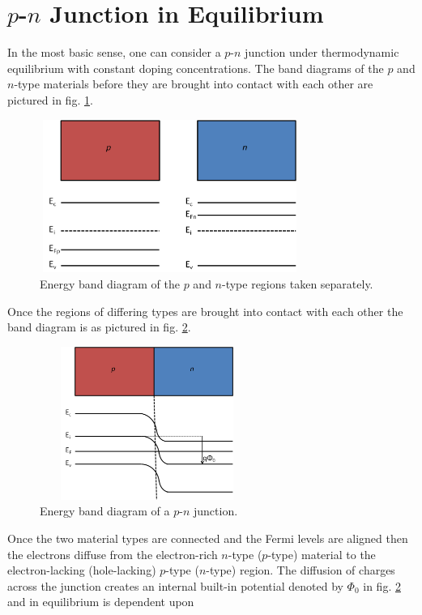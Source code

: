 \documentclass[%
 reprint,
 amsmath,amssymb,
 aps,
pra,
floatfix,
]{revtex4-1}
\begin{document}
\section{$p$-$n$ Junction in Equilibrium}\label{sec:sec002}
In the most basic sense, one can consider a $p$-$n$ junction under thermodynamic equilibrium with 
constant doping concentrations. The band diagrams of the $p$ and $n$-type materials before they are brought
into contact with each other are pictured in  fig. \ref{fig:fig1}. 
%
\begin{figure}[h!]
    \centering
    \includegraphics[height=5cm,width=8.5cm]{figs/unbiased_pn_junction_bands}
    \caption{Energy band diagram of the $p$ and $n$-type regions taken separately.}
    \label{fig:fig1}
\end{figure}
%
Once the regions of differing types are brought into contact with each other the band diagram is as
pictured in fig. \ref{fig:fig2}. 
%
\begin{figure}[h!]
    \centering
    \includegraphics[height=5cm,width=7cm]{figs/unbiased_pn_junction_bands_connected}
    \caption{Energy band diagram of a $p$-$n$ junction.}
    \label{fig:fig2}
\end{figure}
%
Once the two material types are connected and the Fermi levels are aligned then the electrons
diffuse from the electron-rich $n$-type ($p$-type) material to the electron-lacking (hole-lacking)
$p$-type ($n$-type) region. The diffusion of charges across the junction creates an internal
built-in potential denoted by $\Phi_0$ in fig. \ref{fig:fig2} and in equilibrium is dependent upon 
\end{document}
